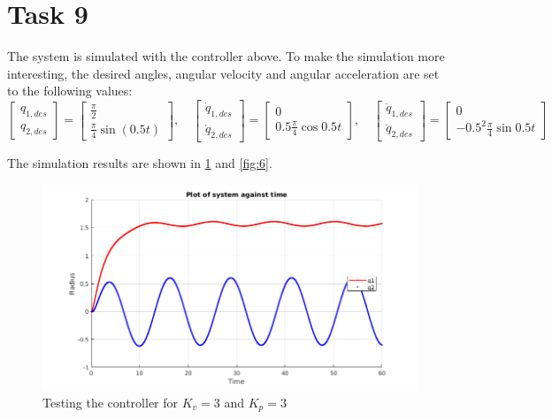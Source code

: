\documentclass[a4paper,12pt,oneside,onecolumn]{article} %
\begin{document}
\section*{Task 9}
The system is simulated with the controller above. To make the simulation more interesting, the desired angles, angular velocity and angular acceleration are set to the following values:
\begin{equation}
    \begin{bmatrix}
    q_{1,des} \\ q_{2,des}
    \end{bmatrix} = 
    \begin{bmatrix}
    \frac{\pi}{2} \\ \frac{\pi}{4}\sin(0.5t)
    \end{bmatrix} , \quad
    \begin{bmatrix}
    \dot{q}_{1,des} \\ \dot{q}_{2,des}
    \end{bmatrix} = 
    \begin{bmatrix}
    0 \\ 0.5 \frac{\pi}{4} \cos{0.5t}
    \end{bmatrix} , \quad
    \begin{bmatrix}
    \ddot{q}_{1,des} \\ \ddot{q}_{2,des}
    \end{bmatrix} = 
    \begin{bmatrix}
    0 \\ -0.5^2 \frac{\pi}{4} \sin{0.5t}
    \end{bmatrix} 
\end{equation}

The simulation results are shown in \ref{fig:5} and \ref{fig:6}.

\begin{figure}[ht]
    \centering
    \includegraphics[scale=0.4]{cont2_3_3.png}
    \caption{Testing the controller for $K_v=3$ and $K_p=3$}
    \label{fig:5} 
\end{figure} 
\end{document}
